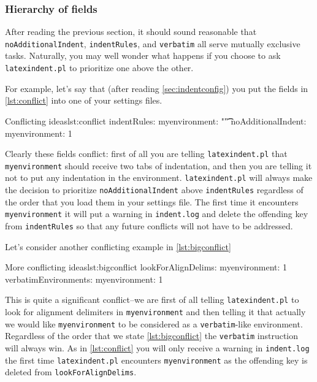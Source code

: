 \documentclass[11pt]{article}
\begin{document}
\subsubsection{Hierarchy of fields}\label{sec:fieldhierachy}
After reading the previous section, it should sound reasonable that
\lstinline!noAdditionalIndent!, \lstinline!indentRules!, and
\lstinline!verbatim! all serve mutually exclusive tasks. Naturally, you may
well wonder what happens if you choose to ask \lstinline!latexindent.pl! to
prioritize one above the other.

For example, let's say that (after reading \cref{sec:indentconfig}) you put the fields in \cref{lst:conflict} into
one of your settings files.
\begin{cmhlistings}[style=yaml]{Conflicting ideas}{lst:conflict}
indentRules:
   myenvironment: "\t\t"
noAdditionalIndent:
   myenvironment: 1
\end{cmhlistings}

Clearly these fields conflict: first of all
you are telling \lstinline!latexindent.pl! that \lstinline!myenvironment! should
receive two tabs of indentation, and then you are telling it
not to put any indentation in the environment. \lstinline!latexindent.pl!
will always make the decision to prioritize \lstinline!noAdditionalIndent! above
\lstinline!indentRules! regardless of the order that you load them in
your settings file. The first
time it encounters \lstinline!myenvironment! it will put a warning in \lstinline!indent.log!
and delete the offending key from \lstinline!indentRules! so that any future
conflicts will not have to be addressed.

Let's consider another conflicting example in \cref{lst:bigconflict}
\begin{cmhlistings}[style=yaml]{More conflicting ideas}{lst:bigconflict}
lookForAlignDelims:
   myenvironment: 1
verbatimEnvironments:
   myenvironment: 1
\end{cmhlistings}
This is quite a significant conflict--we are first of all telling \lstinline!latexindent.pl!
to look for alignment delimiters in \lstinline!myenvironment! and then
telling it that actually we would like \lstinline!myenvironment! to be considered
as a \lstinline!verbatim!-like environment. Regardless of the order that we
state \cref{lst:bigconflict} the \lstinline!verbatim! instruction will always win.
As in \cref{lst:conflict} you will only receive a warning in \lstinline!indent.log! the
first time \lstinline!latexindent.pl! encounters \lstinline!myenvironment! as the
offending key is deleted from \lstinline!lookForAlignDelims!.
\end{document}
